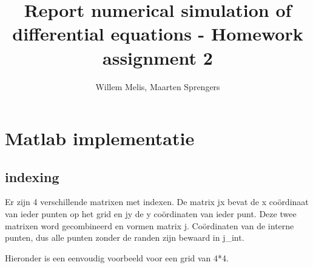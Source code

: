 \documentclass[11pt]{article} %
\title{Report numerical simulation of differential equations - Homework assignment 2}
\author{Willem Melis, Maarten Sprengers}
\begin{document}
\maketitle
\newpage
\tableofcontents
\newpage

\section{Matlab implementatie}
\subsection{indexing}
Er zijn 4 verschillende matrixen met indexen. De matrix jx bevat de x coördinaat van ieder punten op het grid en jy de y coördinaten van ieder punt. Deze twee matrixen word gecombineerd en vormen matrix j. Coördinaten van de interne punten, dus alle punten zonder de randen zijn bewaard in j\_int.

Hieronder is een eenvoudig voorbeeld voor een grid van 4*4.
\end{document}
